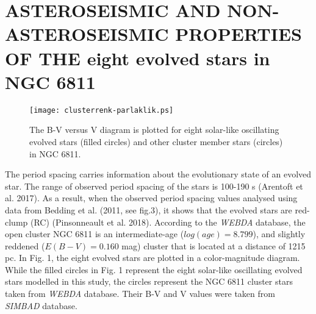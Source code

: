 \documentclass[a4paper,fleqn,usenatbib]{mnras}     %
\begin{document}
{\section{ASTEROSEISMIC AND NON-ASTEROSEISMIC PROPERTIES OF THE eight evolved stars in NGC 6811}

\begin{figure}
\begin{center}
\texttt{[image: clusterrenk-parlaklik.ps]}
        \caption{The B-V versus V diagram is plotted for eight solar-like oscillating evolved stars (filled circles) and other cluster member stars (circles) in NGC 6811.
}
\end{center}
\end{figure}


The period spacing carries 
information about the evolutionary state of 
an evolved star.
The range of observed period spacing of 
the stars is 100-190 s (Arentoft et al. 2017). 
As a result, when the observed period spacing 
values analysed using data from 
 Bedding et al. (2011, see fig.3), 
it shows that the evolved stars are
red-clump (RC)
(Pinsonneault et al. 2018).
According to the \emph{WEBDA} database,
the open cluster NGC 6811 is an intermediate-age ($log(age)=8.799$),
and slightly reddened ($E(B- V)=0.160$ mag) cluster
that is located at a distance of 1215 pc.
In Fig. 1, the eight evolved stars 
are plotted in a color-magnitude diagram.
While the filled circles in Fig. 1 represent 
the eight solar-like oscillating evolved stars modelled 
in this study, 
the circles represent the NGC 6811 cluster stars 
taken from \emph{WEBDA} database. 
Their B-V and V values were taken from \emph{SIMBAD} database.

}
\end{document}
